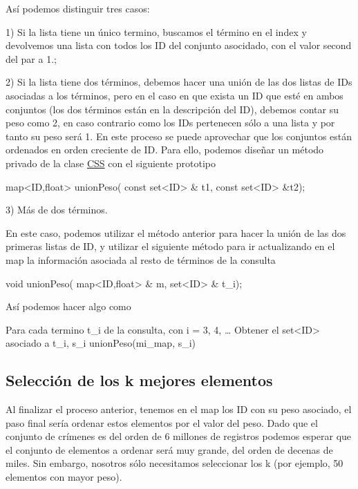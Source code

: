 Así podemos distinguir tres casos\+:

\begin{DoxyItemize}
\item 1) Si la lista tiene un único termino, buscamos el término en el index y devolvemos una lista con todos los I\+D del conjunto asocidado, con el valor second del par a 1.; \item 2) Si la lista tiene dos términos, debemos hacer una unión de las dos listas de I\+Ds asociadas a los términos, pero en el caso en que exista un I\+D que esté en ambos conjuntos (los dos términos están en la descripción del I\+D), debemos contar su peso como 2, en caso contrario como los I\+Ds pertenecen sólo a una lista y por tanto su peso será 1. En este proceso se puede aprovechar que los conjuntos están ordenados en orden creciente de I\+D. Para ello, podemos diseñar un método privado de la clase \hyperlink{classCSS}{C\+S\+S} con el siguiente prototipo\end{DoxyItemize}

\begin{DoxyCode}
map<ID,float> unionPeso( \textcolor{keyword}{const} set<ID> & t1, \textcolor{keyword}{const} set<ID> &t2); 
\end{DoxyCode}


\begin{DoxyItemize}
\item 3) Más de dos términos.\end{DoxyItemize}
En este caso, podemos utilizar el método anterior para hacer la unión de las dos primeras listas de I\+D, y utilizar el siguiente método para ir actualizando en el map la información asociada al resto de términos de la consulta 
\begin{DoxyCode}
\textcolor{keywordtype}{void} unionPeso( map<ID,float> & m, set<ID> & t\_i);
\end{DoxyCode}


Así podemos hacer algo como 
\begin{DoxyCode}
Para cada termino t\_i de la consulta, con i = 3, 4, …
   Obtener el set<ID> asociado a t\_i, s\_i
   unionPeso(mi\_map, s\_i)
\end{DoxyCode}
\hypertarget{index_ordenar}{}\subsection{Selección de los k mejores elementos}\label{index_ordenar}
Al finalizar el proceso anterior, tenemos en el map los I\+D con su peso asociado, el paso final sería ordenar estos elementos por el valor del peso. Dado que el conjunto de crímenes es del orden de 6 millones de registros podemos esperar que el conjunto de elementos a ordenar será muy grande, del orden de decenas de miles. Sin embargo, nosotros sólo necesitamos seleccionar los k (por ejemplo, 50 elementos con mayor peso).

